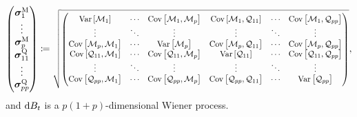 \begin{equation}\label{2305:eq:generic_p_variance}
  \begin{pmatrix}
    \vec{\sigma}^\M_{1}\\
    \vdots\\
    \vec{\sigma}^\M_{p}\\
    \vec{\sigma}^\Q_{11}\\
    \vdots \\
    \vec{\sigma}^\Q_{pp}
  \end{pmatrix}
  \coloneqq
  \scalebox{0.85}{$\sqrt{
    \begin{pmatrix}
        \Var{\left[\mathcal{M}_1\right]} &
        \cdots &
        \Cov{\left[\mathcal{M}_1,\mathcal{M}_{p}\right]} &
        \Cov{\left[\mathcal{M}_1,\mathcal{Q}_{11}\right]} &
        \cdots &
        \Cov{\left[\mathcal{M}_1,\mathcal{Q}_{pp}\right]} \\
        \vdots & \ddots & \vdots & \vdots & \ddots & \vdots \\
        \Cov{\left[\mathcal{M}_p,\mathcal{M}_{1}\right]} &
        \cdots &
        \Var{\left[\mathcal{M}_p\right]} &
        \Cov{\left[\mathcal{M}_p,\mathcal{Q}_{11}\right]} &
        \cdots &
        \Cov{\left[\mathcal{M}_p,\mathcal{Q}_{pp}\right]} \\
        \Cov{\left[\mathcal{Q}_{11},\mathcal{M}_{1}\right]} &
        \cdots &
        \Cov{\left[\mathcal{Q}_{11},\mathcal{M}_{p}\right]} &
        \Var{\left[\mathcal{Q}_{11}\right]} &
        \cdots &
        \Cov{\left[\mathcal{Q}_{11},\mathcal{Q}_{pp}\right]} \\
        \vdots & \ddots & \vdots & \vdots & \ddots & \vdots \\
        \Cov{\left[\mathcal{Q}_{pp},\mathcal{M}_{1}\right]} &
        \cdots &
        \Cov{\left[\mathcal{Q}_{pp},\mathcal{M}_{p}\right]} &
        \Cov{\left[\mathcal{Q}_{pp},\mathcal{Q}_{11}\right]} &
        \cdots &
        \Var{\left[\mathcal{Q}_{pp}\right]}
    \end{pmatrix}
  }$},
\end{equation}
and  \(\dif \b_t\) is a \(p(1+p)\)-dimensional Wiener process.

